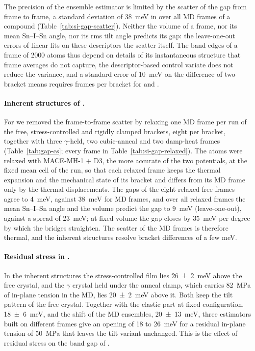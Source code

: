 {The precision of the ensemble estimator is limited by the scatter of the gap from frame to
frame, a standard deviation of \SI{38}{meV} in \CsSnI{}  over all
MD frames of a compound (Table~\ref{tab:si-gap-scatter}).
Neither the volume of a frame, nor its mean Sn--I--Sn angle, nor its rms tilt angle predicts its
gap: the leave-one-out errors of linear fits on these descriptors 
the scatter itself. The
band edges of a frame of 2000 atoms thus depend on details of its instantaneous structure that
frame averages do not capture, the descriptor-based control variate does not reduce the variance,
and a standard error of \SI{10}{meV} on the difference of two bracket means requires 
frames per bracket for \CsSnI{} and \FASnI{}.

{\changedcolor
\paragraph{Inherent structures of \CsSnI{}.}
For \CsSnI{} we removed the frame-to-frame scatter by relaxing one MD frame per run of the free,
stress-controlled and rigidly clamped brackets, eight per bracket, together with three
$\gamma$-held, two cubic-anneal and two damp-heat frames (Table~\ref{tab:gap-cs}; every frame in
Table~\ref{tab:si-gap-relaxed}). The atoms were relaxed with MACE-MH-1 + D3, the more accurate of
the two potentials, at the fixed mean cell of the run, so that each relaxed frame keeps the
thermal expansion and the mechanical state of its bracket and differs from its MD frame only by
the thermal displacements. The gaps of the eight relaxed free frames agree to \SI{4}{meV}, against
\SI{38}{meV} for MD frames, and over all relaxed frames the mean Sn--I--Sn angle and the volume
predict the gap to \SI{9}{meV} (leave-one-out), against a spread of \SI{23}{meV}; at fixed volume
the gap closes by \SI{35}{meV} per degree by which the bridges straighten. The scatter of the MD
frames is therefore thermal, and the inherent structures resolve bracket differences of a few meV.

\paragraph{Residual stress in \CsSnI{}.}
In the inherent structures the stress-controlled film lies \SI{26 \pm 2}{meV} above the free
crystal, and the $\gamma$ crystal held under the anneal clamp, which carries \SI{82}{MPa} of
in-plane tension in the MD, lies \SI{20 \pm 2}{meV} above it. Both keep the tilt pattern of the free
crystal. Together with the elastic part at fixed configuration, \SI{18 \pm 6}{meV}, and the shift
of the MD ensembles, \SI{20 \pm 13}{meV}, three estimators built on different frames give an
opening of 18 to \SI{26}{meV} for a residual in-plane tension of \SI{50}{MPa} that leaves the tilt
variant unchanged. This is the effect of residual stress on the band gap of \CsSnI{}.

}}
